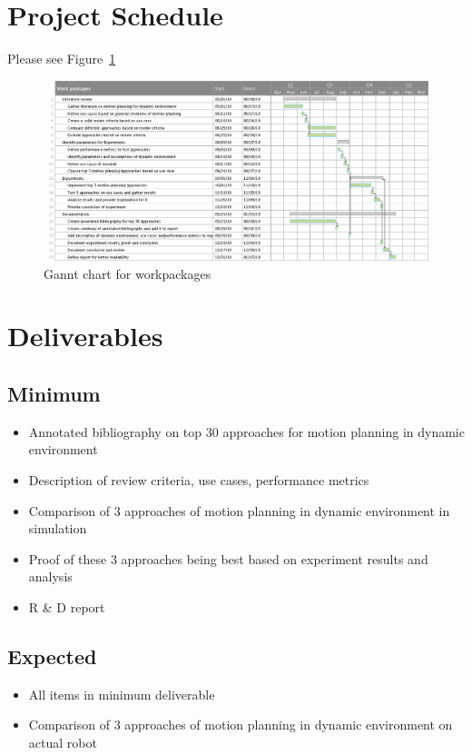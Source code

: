 \documentclass[rnd]{mas_proposal}
\begin{document}
\section{Project Schedule}
Please see Figure~\ref{fig:gantt}
\begin{figure}[h!]
    \includegraphics[width=1.0\textwidth]{gantt_chart2.png}
    \caption{Gannt chart for workpackages\label{fig:gantt}}
\end{figure}

\section{Deliverables}
\subsection{Minimum}

\begin{itemize}
    \item Annotated bibliography on top 30 approaches for motion planning in dynamic environment
    \item Description of review criteria, use cases, performance metrics
    \item Comparison of 3 approaches of motion planning in dynamic environment in simulation
    \item Proof of these 3 approaches being best based on experiment results and analysis
    \item R \& D report 
\end{itemize}

\subsection{Expected}
\begin{itemize}
    \item All items in minimum deliverable
    \item Comparison of 3 approaches of motion planning in dynamic environment on actual robot
\end{itemize}
\end{document}
